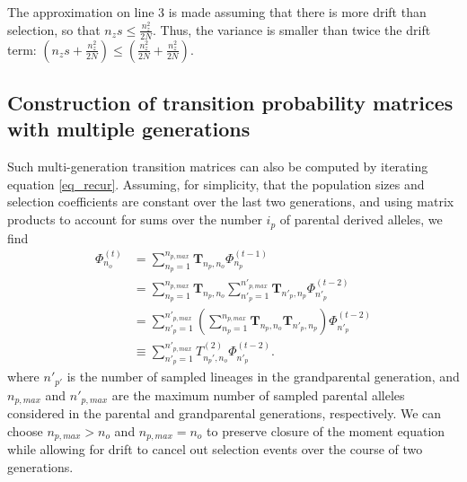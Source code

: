 \documentclass[review]{elsarticle}
\newcommand{\afs}[2]{\Phi_{#1}^{(#2)}}
\begin{document}
The approximation on line 3 is made assuming that there is more drift than selection, so that $n_zs
\leq \frac{n_z^2}{2N}$. Thus, the variance is smaller than twice the drift term: $\left(n_zs +
\frac{n_z^2}{2N} \right) \leq \left(\frac{n_z^2}{2N} + \frac{n_z^2}{2N} \right)$.

\subsection{Construction of transition probability matrices with multiple generations}
\label{subsec_apx_multi}

Such multi-generation transition matrices can also be computed by iterating equation \eqref{eq_recur}. 
Assuming, for simplicity, that the population sizes and selection coefficients are constant over the last two generations, 
and using matrix products to account for sums over the number $i_p$ of parental derived alleles, we find 
\begin{equation}
\begin{split}
\afs{n_o}{t} &=  \sum_{n_p=1}^{n_{p,max}}  \mathbf{T}_{n_p,n_o}     \afs{n_p}{t-1}\\
&=  \sum_{n_p=1}^{n_{p,max}} \mathbf{T}_{n_p,n_o}     \sum_{n'_p=1}^{n'_{p,max}}  \mathbf{T}_{n'_p,n_p}\afs{n'_p}{t-2}\\
&=  \sum_{n'_p=1}^{n'_{p,max}}  \left(\sum_{n_p=1}^{n_{p,max}} \mathbf{T}_{n_p,n_o}      \mathbf{T}_{n'_p,n_p} \right)\afs{n'_p}{t-2}\\
&\equiv  \sum_{n'_p=1}^{n'_{p,max}}  T^{(2)}_{n_p',n_o} \afs{n'_p}{t-2}.
\end{split}
\end{equation}
where $n'_{p'}$ is the number of sampled lineages in the grandparental generation, and $n_{p,max}$ and $n'_{p,max}$ are the maximum number of 
sampled parental alleles considered in the parental and grandparental generations, respectively.  We can choose $n_{p,max}>n_o$ and
$n_{p,max} = n_o$  to preserve closure of the moment equation while allowing for drift to cancel out selection events over the course of two generations. 
\end{document}
